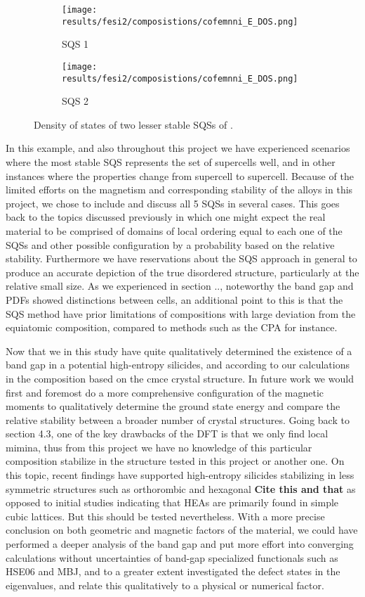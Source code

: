 \begin{figure}[H]
\begin{subfigure}{.5\textwidth}
\texttt{[image: results/fesi2/composistions/cofemnni\_E\_DOS.png]}
\caption{SQS 1}
\end{subfigure}
\begin{subfigure}{.5\textwidth}
\texttt{[image: results/fesi2/composistions/cofemnni\_E\_DOS.png]}
\caption{SQS 2}
\end{subfigure}
\caption{Density of states of two lesser stable SQSs of .}
\end{figure} 

In this example, and also throughout this project we have experienced scenarios where the most stable SQS represents the set of supercells well, and in other instances where the properties change from supercell to supercell. Because of the limited efforts on the magnetism and corresponding stability of the alloys in this project, we chose to include and discuss all 5 SQSs in several cases. This goes back to the topics discussed previously in which one might expect the real material to be comprised of domains of local ordering equal to each one of the SQSs and other possible configuration by a probability based on the relative stability. Furthermore we have reservations about the SQS approach in general to produce an accurate depiction of the true disordered structure, particularly at the relative small size. As we experienced in section .., noteworthy the band gap and PDFs showed distinctions between cells, an additional point to this is that the SQS method have prior limitations of compositions with large deviation from the equiatomic composition, compared to methods such as the CPA for instance.   

Now that we in this study have quite qualitatively determined the existence of a band gap in a potential high-entropy silicides, and according to our calculations in the  composition based on the cmce crystal structure. In future work we would first and foremost do a more comprehensive configuration of the magnetic moments to qualitatively determine the ground state energy and compare the relative stability between a broader number of crystal structures. Going back to section 4.3, one of the key drawbacks of the DFT is that we only find local mimina, thus from this project we have no knowledge of this particular composition stabilize in the structure tested in this project or another one. On this topic, recent findings have supported high-entropy silicides stabilizing in less symmetric structures such as orthorombic and hexagonal \textbf{Cite this and that} as opposed to initial studies indicating that HEAs are primarily found in simple cubic lattices. But this should be tested nevertheless. With a more precise conclusion on both geometric and magnetic factors of the material, we could have performed a deeper analysis of the band gap and put more effort into converging calculations without uncertainties of band-gap specialized functionals such as HSE06 and MBJ, and to a greater extent investigated the defect states in the eigenvalues, and relate this qualitatively to a physical or numerical factor.
 
